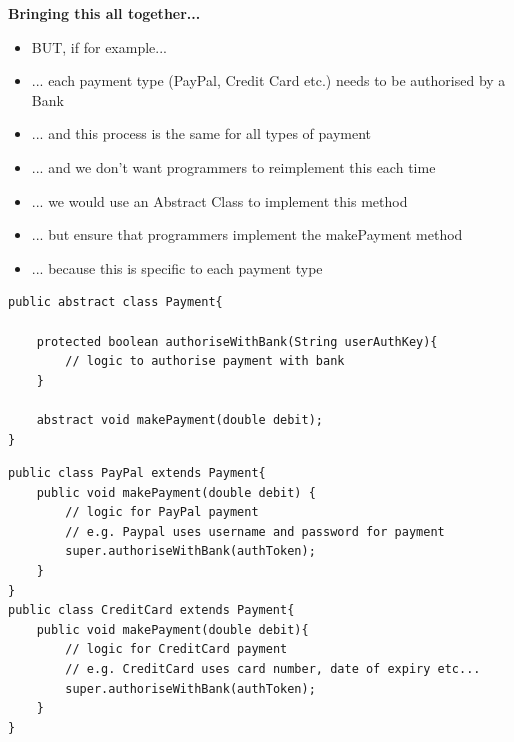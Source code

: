 \documentclass{beamer}
\begin{document}
\begin{frame}
\begin{center}
\textbf{Bringing this all together...}
\end{center}
\begin{itemize}
\item BUT, if for example... 
\item ... each payment type (PayPal, Credit Card etc.) needs to be authorised by a Bank
\item ... and this process is the same for all types of payment
\item ... and we don't want programmers to reimplement this each time
\bigskip
\item ... we would use an Abstract Class to implement this method
\item ... but ensure that programmers implement the makePayment method
\item ... because this is specific to each payment type
\end{itemize}
\end{frame}

\begin{frame}[fragile]
\begin{block}{}
\begin{lstlisting}
public abstract class Payment{

    protected boolean authoriseWithBank(String userAuthKey){
        // logic to authorise payment with bank
    }

    abstract void makePayment(double debit);
}
\end{lstlisting}
\end{block}
\end{frame}

\begin{frame}[fragile]
\begin{block}{}
\begin{lstlisting}
public class PayPal extends Payment{
    public void makePayment(double debit) {
        // logic for PayPal payment
        // e.g. Paypal uses username and password for payment
        super.authoriseWithBank(authToken);
    }
}
public class CreditCard extends Payment{
    public void makePayment(double debit){
        // logic for CreditCard payment
        // e.g. CreditCard uses card number, date of expiry etc...
        super.authoriseWithBank(authToken);
    }
}
\end{lstlisting}
\end{block}
\end{frame}
\end{document}
